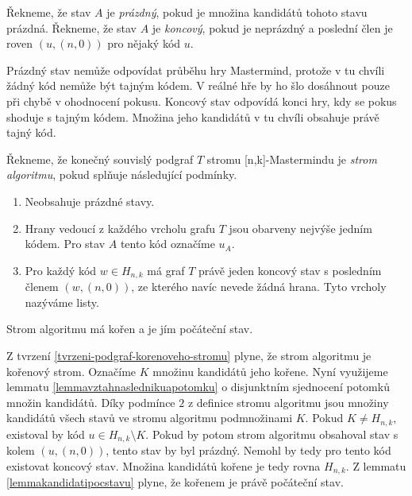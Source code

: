 \begin{definice}\label{kandidat}
  Řekneme, že stav $A$ je \emph{prázdný}, pokud je množina kandidátů tohoto stavu prázdná. Řekneme, že stav $A$ je \emph{koncový}, pokud je neprázdný a poslední člen je roven $(u,(n,0))$ pro nějaký kód $u$.
\end{definice}

Prázdný stav nemůže odpovídat průběhu hry Mastermind, protože v tu chvíli žádný kód nemůže být tajným kódem. V reálné hře by ho šlo dosáhnout pouze při chybě v ohodnocení pokusu. Koncový stav odpovídá konci hry, kdy se pokus shoduje s tajným kódem. Množina jeho kandidátů v tu chvíli obsahuje právě tajný kód. 


\begin{definice}
  Řekneme, že konečný souvislý podgraf $T$ stromu [n,k]-Mastermindu je \emph{strom algoritmu}, pokud splňuje následující podmínky.
  \begin{enumerate}
      \item Neobsahuje prázdné stavy.
      \item Hrany vedoucí z každého vrcholu grafu $T$ jsou obarveny nejvýše jedním kódem. Pro stav $A$ tento kód označíme $u_A$.
      \item Pro každý kód $w \in H_{n,k}$ má graf $T$ právě jeden koncový stav s posledním členem $(w, (n,0))$, ze kterého navíc nevede žádná hrana. Tyto vrcholy nazýváme listy.
  \end{enumerate}
\end{definice}

\begin{tvrz}\label{tvrzkorenstromualg}
    Strom algoritmu má kořen a je jím počáteční stav. 
\end{tvrz}
\begin{dukaz}
    Z tvrzení \ref{tvrzeni-podgraf-korenoveho-stromu} plyne, že strom algoritmu je kořenový strom. Označíme $K$ množinu kandidátů jeho kořene.
    Nyní využijeme lemmatu \ref{lemmavztahnaslednikuapotomku} o disjunktním sjednocení potomků množin kandidátů. Díky podmínce $2$ z definice stromu algoritmu jsou množiny kandidátů všech stavů ve stromu algoritmu podmnožinami $K$. Pokud $K \neq H_{n,k}$, existoval by kód $u \in H_{n,k} \setminus K$. Pokud by potom strom algoritmu obsahoval stav s kolem $(u, (n,0))$, tento stav by byl prázdný. Nemohl by tedy pro tento kód existovat koncový stav. Množina kandidátů kořene je tedy rovna $H_{n,k}$. Z lemmatu \ref{lemmakandidatipocstavu} plyne, že kořenem je právě počáteční stav. 
\end{dukaz}

